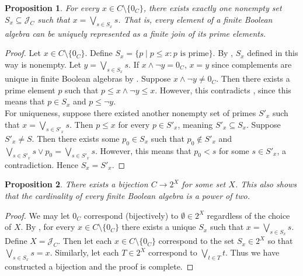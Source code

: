 \documentclass{article}
\newtheorem{proposition}{Proposition}[section]
\newcommand{\meet}{\wedge}
\newcommand{\join}{\vee}
\newcommand{\bigjoin}{\bigvee}
\begin{document}
\begin{proposition} \label{prop:repr-bool-alg-with-primes}
For every $x \in C \setminus \{0_C\}$, there exists exactly one nonempty set $S_x \subseteq \mathcal{J}_C$ such that $x = \bigjoin_{s \in S_x} s$. That is, every element of a finite Boolean algebra can be uniquely represented as a finite join of its prime elements.
\end{proposition}

\begin{proof}
Let $x \in C \setminus \{0_C\}$. Define $S_x = \{p \mid p \leq x : p \text{ is prime}\}$. By , $S_x$ defined in this way is nonempty. Let $y = \bigjoin_{s \in S_x} s$. If $x \meet \neg y = 0_C$, $x = y$ since complements are unique in finite Boolean algebras by . Suppose $x \meet \neg y \neq 0_C$. Then there exists a prime element $p$ such that $p \leq x \meet \neg y \leq x$. However, this contradicts , since this means that $p \in S_x$ and $p \leq \neg y$. \\

For uniqueness, suppose there existed another nonempty set of primes $S'_x$ such that $x = \bigjoin_{s \in S'_x} s$. Then $p \leq x$ for every $p \in S'_x$, meaning $S'_x \subseteq S_x$. Suppose $S'_x \neq S$. Then there exists some $p_0 \in S_x$ such that $p_0 \not\in S'_x$ and $\bigjoin_{s \in S'_x} s \join p_0 = \bigjoin_{s \in S'_x} s$. However, this means that $p_0 < s$ for some $s \in S'_x$, a contradiction. Hence $S_x = S'_x$.
\end{proof}

\begin{proposition}
There exists a bijection $C \to 2^X$ for some set $X$. This also shows that the cardinality of every finite Boolean algebra is a power of two. 
\end{proposition}

\begin{proof}
We may let $0_C$ correspond (bijectively) to $\emptyset \in 2^X$ regardless of the choice of $X$. By , for every $x \in C \setminus \{0_C\}$ there exists a unique $S_x$ such that $x = \bigjoin_{s \in S_x} s$. Define $X = \mathcal{J}_C$. Then let each $x \in C \setminus \{0_C\}$ correspond to the set $S_x \in 2^X$ so that $\bigjoin_{s \in S_x} s = x$. Similarly, let each $T \in 2^X$ correspond to $\bigjoin_{t \in T} t$. Thus we have constructed a bijection and the proof is complete.
\end{proof}
\end{document}
